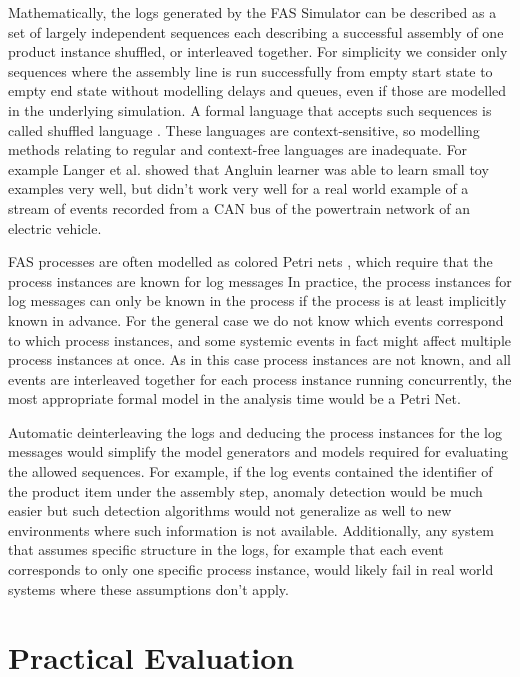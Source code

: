 \documentclass[journal]{IEEEtran}
\begin{document}
Mathematically, the logs generated by the FAS Simulator can be described as a set of largely independent sequences each describing a successful assembly of one product instance shuffled, or interleaved
together.
For simplicity we consider only sequences where the assembly line is run successfully from empty start state to empty end state without modelling delays and queues, even if those are modelled in the underlying
simulation.
A formal language that accepts such sequences is called shuffled language \cite{berglund2011recognizing}. These languages are context-sensitive, so modelling methods
relating to regular and context-free languages are inadequate. For example Langer et al. \cite{langer2011self} showed that Angluin learner was able to learn small
toy examples very well, but didn't work very well for a real world example of a stream of events recorded from a CAN bus of the powertrain network of an electric vehicle.

FAS processes are often modelled as colored Petri nets \cite{saitou2002robust}, which require that the process instances are known for log messages
In practice, the process instances for log messages can only be known in the process
if the process is at least implicitly known in advance. For the general case we do not know which events correspond to which process instances, and some systemic events
in fact might affect multiple process instances at once. As in this
case process instances are not known, and all events are interleaved together for each process instance running concurrently, the most appropriate formal
model in the analysis time would be a Petri Net.

Automatic deinterleaving the logs and deducing the process instances for the log messages would simplify the model generators and models required
for evaluating the allowed sequences.
For example, if the log events contained the identifier of the product
item under the assembly step, anomaly detection would be much easier but such detection algorithms would not generalize as well
to new environments where such information is not available. Additionally, any system that assumes specific structure in the logs, for example that each event corresponds to
only one specific process instance, would likely fail in real world systems where these assumptions don't apply.

\section{Practical Evaluation}
\end{document}
